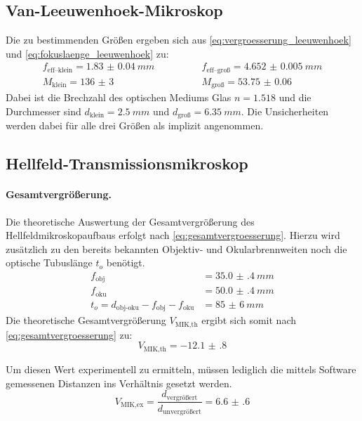 \documentclass[english, ngerman]{scrartcl}
\begin{document}
\subsection{Van-Leeuwenhoek-Mikroskop}
\label{subsec:auswertung_Leeuwenhoek}

Die zu bestimmenden Größen ergeben sich aus \autoref{eq:vergroesserung_leeuwenhoek} und \autoref{eq:fokuslaenge_leeuwenhoek} zu:
%
\begin{align*}
    f_{\text{eff--klein}} = \SI{1.83(4)}{mm} \qquad & \qquad f_{\text{eff--groß}} = \SI{4.652(5)}{mm} \\
    M_\text{klein} = \num{136(3)} \qquad            & \qquad M_\text{groß} = \num{53.75(6)}
\end{align*}
%
Dabei ist die Brechzahl des optischen Mediums Glas $n = \num{1.518}$ und die Durchmesser sind $d_\text{klein} = \SI{2.5}{mm}$ und $d_\text{groß} = \SI{6.35}{mm}$. Die Unsicherheiten werden dabei für alle drei Größen als implizit angenommen.


\subsection{Hellfeld-Transmissionsmikroskop}
\label{subsec:auswertung_hellfeld}

\paragraph{Gesamtvergrößerung.}
Die theoretische Auswertung der Gesamtvergrößerung des Hellfeldmikroskopaufbaus erfolgt nach \autoref{eq:gesamtvergroesserung}. Hierzu wird zusätzlich zu den bereits bekannten Objektiv- und Okularbrennweiten noch die optische Tubuslänge $t_o$ benötigt.
\begin{align*}
    f_\text{obj}                                   & = \SI{35.0(4)}{mm} \\
    f_\text{oku}                                   & = \SI{50.0(4)}{mm} \\
    t_o=d_\text{obj-oku}-f_\text{obj}-f_\text{oku} & = \SI{85(6)}{mm}
\end{align*}
%
Die theoretische Gesamtvergrößerung $V_\text{MIK,th}$ ergibt sich somit nach \autoref{eq:gesamtvergroesserung} zu:
\[V_\text{MIK,th} = \num{-12.1(8)}\]

Um diesen Wert experimentell zu ermitteln, müssen lediglich die mittels Software gemessenen Distanzen ins Verhältnis gesetzt werden.
\[V_\text{MIK,ex}=\frac{d_\text{vergrößert}}{d_\text{unvergrößert}}=\num{6.6(6)}\]
\end{document}
